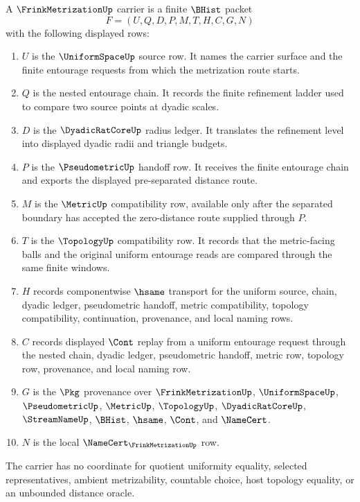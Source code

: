 \begin{definition}
\label{def:frink-metrization-carrier}
A $\FrinkMetrizationUp$ carrier is a finite $\BHist$ packet
$$
F=(U,Q,D,P,M,T,H,C,G,N)
$$
with the following displayed rows:
\begin{enumerate}
\item $U$ is the $\UniformSpaceUp$ source row. It names the carrier surface and the finite entourage requests from which the metrization route starts.
\item $Q$ is the nested entourage chain. It records the finite refinement ladder used to compare two source points at dyadic scales.
\item $D$ is the $\DyadicRatCoreUp$ radius ledger. It translates the refinement level into displayed dyadic radii and triangle budgets.
\item $P$ is the $\PseudometricUp$ handoff row. It receives the finite entourage chain and exports the displayed pre-separated distance route.
\item $M$ is the $\MetricUp$ compatibility row, available only after the separated boundary has accepted the zero-distance route supplied through $P$.
\item $T$ is the $\TopologyUp$ compatibility row. It records that the metric-facing balls and the original uniform entourage reads are compared through the same finite windows.
\item $H$ records componentwise $\hsame$ transport for the uniform source, chain, dyadic ledger, pseudometric handoff, metric compatibility, topology compatibility, continuation, provenance, and local naming rows.
\item $C$ records displayed $\Cont$ replay from a uniform entourage request through the nested chain, dyadic ledger, pseudometric handoff, metric row, topology row, provenance, and local naming row.
\item $G$ is the $\Pkg$ provenance over $\FrinkMetrizationUp$, $\UniformSpaceUp$, $\PseudometricUp$, $\MetricUp$, $\TopologyUp$, $\DyadicRatCoreUp$, $\StreamNameUp$, $\BHist$, $\hsame$, $\Cont$, and $\NameCert$.
\item $N$ is the local $\NameCert_{\FrinkMetrizationUp}$ row.
\end{enumerate}
The carrier has no coordinate for quotient uniformity equality, selected representatives, ambient metrizability, countable choice, host topology equality, or an unbounded distance oracle.
\end{definition}

